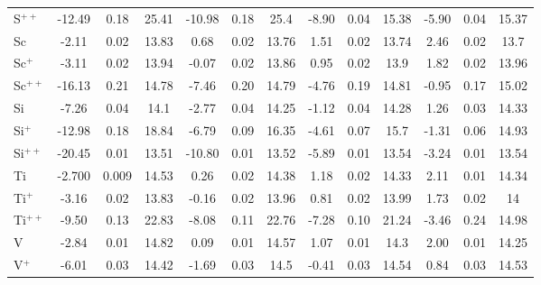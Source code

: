 \begin{longtable}{l!{\vrule width 0.25pt}ccc!{\vrule width 0.25pt}ccc!{\vrule width 0.25pt}ccc!{\vrule width 0.25pt}ccc}
S$^{++}$ & -12.49 & 0.18 & 25.41 & -10.98 & 0.18 & 25.4 & -8.90 & 0.04 & 15.38 & -5.90 & 0.04 & 15.37 \\
Sc & -2.11 & 0.02 & 13.83 & 0.68 & 0.02 & 13.76 & 1.51 & 0.02 & 13.74 & 2.46 & 0.02 & 13.7 \\
Sc$^+$ & -3.11 & 0.02 & 13.94 & -0.07 & 0.02 & 13.86 & 0.95 & 0.02 & 13.9 & 1.82 & 0.02 & 13.96 \\
Sc$^{++}$ & -16.13 & 0.21 & 14.78 & -7.46 & 0.20 & 14.79 & -4.76 & 0.19 & 14.81 & -0.95 & 0.17 & 15.02 \\
Si & -7.26 & 0.04 & 14.1 & -2.77 & 0.04 & 14.25 & -1.12 & 0.04 & 14.28 & 1.26 & 0.03 & 14.33 \\
Si$^+$ & -12.98 & 0.18 & 18.84 & -6.79 & 0.09 & 16.35 & -4.61 & 0.07 & 15.7 & -1.31 & 0.06 & 14.93 \\
Si$^{++}$ & -20.45 & 0.01 & 13.51 & -10.80 & 0.01 & 13.52 & -5.89 & 0.01 & 13.54 & -3.24 & 0.01 & 13.54 \\
Ti & -2.700 & 0.009 & 14.53 & 0.26 & 0.02 & 14.38 & 1.18 & 0.02 & 14.33 & 2.11 & 0.01 & 14.34 \\
Ti$^+$ & -3.16 & 0.02 & 13.83 & -0.16 & 0.02 & 13.96 & 0.81 & 0.02 & 13.99 & 1.73 & 0.02 & 14 \\
Ti$^{++}$ & -9.50 & 0.13 & 22.83 & -8.08 & 0.11 & 22.76 & -7.28 & 0.10 & 21.24 & -3.46 & 0.24 & 14.98 \\
V & -2.84 & 0.01 & 14.82 & 0.09 & 0.01 & 14.57 & 1.07 & 0.01 & 14.3 & 2.00 & 0.01 & 14.25 \\
V$^+$ & -6.01 & 0.03 & 14.42 & -1.69 & 0.03 & 14.5 & -0.41 & 0.03 & 14.54 & 0.84 & 0.03 & 14.53 \\
\end{longtable}


